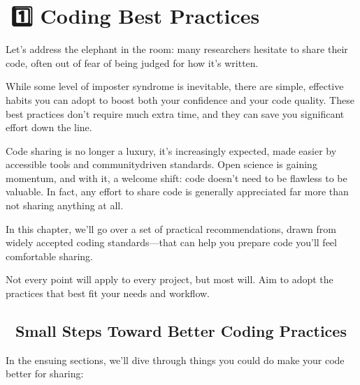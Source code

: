 \documentclass[letterpaper,10pt,english]{jupyterBook}
\begin{document}
\sphinxstepscope


\section{📘1️⃣ Coding Best Practices}
\label{\detokenize{chapters/02/02a_coding-best-practices:coding-best-practices}}\label{\detokenize{chapters/02/02a_coding-best-practices::doc}}
\sphinxAtStartPar
Let’s address the elephant in the room: many researchers hesitate to share their code, often out of fear of being judged for how it’s written.

\sphinxAtStartPar
While some level of imposter syndrome is inevitable, there are simple, effective habits you can adopt to boost both your confidence and your code quality. These best practices don’t require much extra time, and they can save you significant effort down the line.

\sphinxAtStartPar
Code sharing is no longer a luxury, it’s increasingly expected, made easier by accessible tools and community\sphinxhyphen{}driven standards. Open science is gaining momentum, and with it, a welcome shift: code doesn’t need to be flawless to be valuable. In fact, any effort to share code is generally appreciated far more than not sharing anything at all.

\sphinxAtStartPar
In this chapter, we’ll go over a set of practical recommendations, drawn from widely accepted coding standards—that can help you prepare code you’ll feel comfortable sharing.

\sphinxAtStartPar
Not every point will apply to every project, but most will. Aim to adopt the practices that best fit your needs and workflow.


\subsection{👣 Small Steps Toward Better Coding Practices}
\label{\detokenize{chapters/02/02a_coding-best-practices:small-steps-toward-better-coding-practices}}
\sphinxAtStartPar
In the ensuing sections, we’ll dive through things you could do make your code better for sharing:
\end{document}

